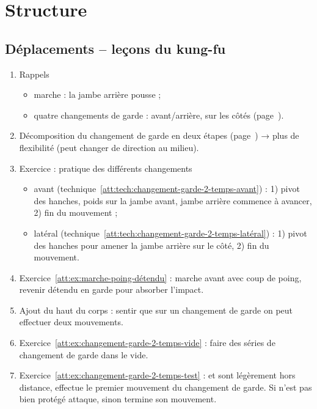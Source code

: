\section{Structure}


\subsection{Déplacements -- leçons du kung-fu}




\begin{enumerate}
	\item Rappels
	\begin{itemize}
		\item marche : la jambe arrière pousse ;
		\item quatre changements de garde : avant/arrière, sur les côtés (page~\pageref{dep:def:changement-garde-avant}).
	\end{itemize}
	
	\item Décomposition du changement de garde en deux étapes (page~\pageref{def:texte:garde-kung-fu}) → plus de flexibilité (peut changer de direction au milieu).
	
	\item Exercice : pratique des différents changements
	\begin{itemize}
		\item avant (technique~\ref{att:tech:changement-garde-2-temps-avant}) : 1) pivot des hanches, poids sur la jambe avant, jambe arrière commence à avancer, 2) fin du mouvement ;
		\item latéral (technique~\ref{att:tech:changement-garde-2-temps-latéral}) : 1) pivot des hanches pour amener la jambe arrière sur le côté, 2) fin du mouvement.
	\end{itemize}
	
	\item Exercice~\ref{att:ex:marche-poing-détendu} : marche avant avec coup de poing, revenir détendu en garde pour absorber l'impact.
	
	\item Ajout du haut du corps : sentir que sur un changement de garde on peut effectuer deux mouvements.
	
	\item Exercice~\ref{att:ex:changement-garde-2-temps-vide} : faire des séries de changement de garde dans le vide.
	
	\item Exercice~\ref{att:ex:changement-garde-2-temps-test} : \A et \D sont légèrement hors distance, \A effectue le premier mouvement du changement de garde.
	Si \A n'est pas bien protégé \D attaque, sinon \A termine son mouvement.
	

\end{enumerate}
